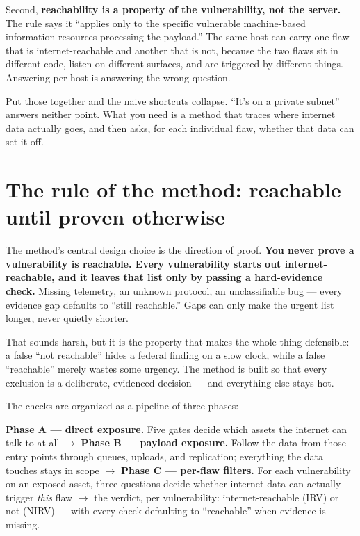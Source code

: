 \documentclass[11pt]{article}
\begin{document}
Second, \textbf{reachability is a property of the vulnerability, not the server.}
The rule says it ``applies only to the specific vulnerable machine-based
information resources processing the payload.'' The same host can carry one flaw
that is internet-reachable and another that is not, because the two flaws sit in
different code, listen on different surfaces, and are triggered by different
things. Answering per-host is answering the wrong question.

Put those together and the naive shortcuts collapse. ``It's on a private subnet''
answers neither point. What you need is a method that traces where internet data
actually goes, and then asks, for each individual flaw, whether that data can set
it off.

\section*{The rule of the method: reachable until proven otherwise}
The method's central design choice is the direction of proof. \textbf{You never
prove a vulnerability is reachable. Every vulnerability starts out
internet-reachable, and it leaves that list only by passing a hard-evidence
check.} Missing telemetry, an unknown protocol, an unclassifiable bug --- every
evidence gap defaults to ``still reachable.'' Gaps can only make the urgent list
longer, never quietly shorter.

That sounds harsh, but it is the property that makes the whole thing defensible: a
false ``not reachable'' hides a federal finding on a slow clock, while a false
``reachable'' merely wastes some urgency. The method is built so that every
exclusion is a deliberate, evidenced decision --- and everything else stays hot.

The checks are organized as a pipeline of three phases:

\begin{plain}
\textbf{Phase A --- direct exposure.} Five gates decide which assets the internet
can talk to at all $\rightarrow$ \textbf{Phase B --- payload exposure.} Follow the
data from those entry points through queues, uploads, and replication; everything
the data touches stays in scope $\rightarrow$ \textbf{Phase C --- per-flaw
filters.} For each vulnerability on an exposed asset, three questions decide
whether internet data can actually trigger \emph{this} flaw $\rightarrow$ the
verdict, per vulnerability: internet-reachable (IRV) or not (NIRV) --- with every
check defaulting to ``reachable'' when evidence is missing.
\end{plain}
\end{document}
